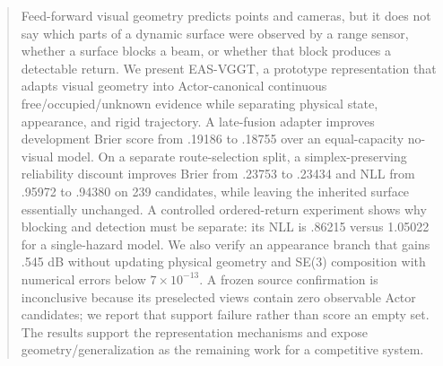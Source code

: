 \begin{abstract}
Feed-forward visual geometry predicts points and cameras, but it does not say which
parts of a dynamic surface were observed by a range sensor, whether a surface blocks a
beam, or whether that block produces a detectable return. We present EAS-VGGT, a
prototype representation that adapts visual geometry into Actor-canonical continuous
free/occupied/unknown evidence while separating physical state, appearance, and rigid
trajectory. A late-fusion adapter improves development Brier score from .19186 to
.18755 over an equal-capacity no-visual model. On a separate route-selection split, a
simplex-preserving reliability discount improves Brier from .23753 to .23434 and NLL
from .95972 to .94380 on 239 candidates, while leaving the inherited surface essentially
unchanged. A controlled ordered-return experiment shows why blocking and detection
must be separate: its NLL is .86215 versus 1.05022 for a single-hazard model. We also
verify an appearance branch that gains .545 dB without updating physical geometry and
SE(3) composition with numerical errors below $7\!\times\!10^{-13}$. A frozen source
confirmation is inconclusive because its preselected views contain zero observable
Actor candidates; we report that support failure rather than score an empty set. The
results support the representation mechanisms and expose geometry/generalization as
the remaining work for a competitive system.
\end{abstract}

